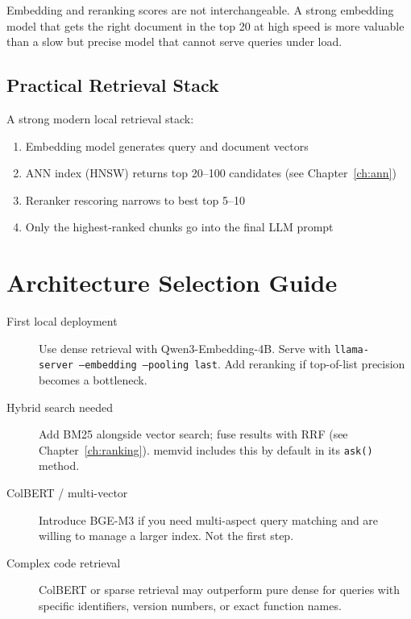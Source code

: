 Embedding and reranking scores are not interchangeable. A strong embedding model that gets
the right document in the top 20 at high speed is more valuable than a slow but precise model
that cannot serve queries under load.

\subsection{Practical Retrieval Stack}

A strong modern local retrieval stack:

\begin{enumerate}
    \item Embedding model generates query and document vectors
    \item ANN index (HNSW) returns top 20--100 candidates (see Chapter~\ref{ch:ann})
    \item Reranker rescoring narrows to best top 5--10
    \item Only the highest-ranked chunks go into the final LLM prompt
\end{enumerate}

\section{Architecture Selection Guide}

\begin{description}
    \item[First local deployment] Use dense retrieval with Qwen3-Embedding-4B. Serve with
          \texttt{llama-server~--embedding~--pooling~last}. Add reranking if top-of-list
          precision becomes a bottleneck.
    \item[Hybrid search needed] Add BM25 alongside vector search; fuse results with RRF (see
          Chapter~\ref{ch:ranking}). memvid includes this by default in its \texttt{ask()} method.
    \item[ColBERT / multi-vector] Introduce BGE-M3 if you need multi-aspect query matching
          and are willing to manage a larger index. Not the first step.
    \item[Complex code retrieval] ColBERT or sparse retrieval may outperform pure dense for
          queries with specific identifiers, version numbers, or exact function names.
\end{description}
